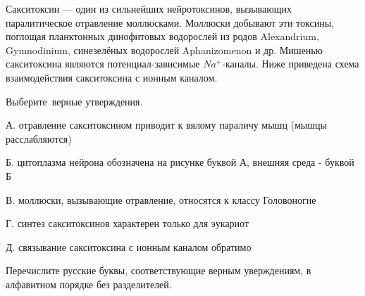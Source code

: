 
Сакситоксин — один из сильнейших нейротоксинов, вызывающих паралитическое отравление моллюсками. Моллюски добывают эти токсины, поглощая планктонных динофитовых водорослей из родов Alexandrium, Gymnodinium, синезелёных водорослей Aphanizomenon и др. Мишенью сакситоксина являются потенциал-зависимые $Na^+$-каналы. Ниже приведена схема взаимодействия сакситоксина с ионным каналом.


Выберите верные утверждения.

А. отравление сакситоксином приводит к вялому параличу мышц (мышцы расслабляются)

Б. цитоплазма нейрона обозначена на рисунке буквой А, внешняя среда - буквой Б

В. моллюски, вызывающие отравление, относятся к классу Головоногие

Г. синтез сакситоксинов характерен только для эукариот

Д. связывание сакситоксина с ионным каналом обратимо

Перечислите русские буквы, соответствующие верным уверждениям, в алфавитном порядке без разделителей.



